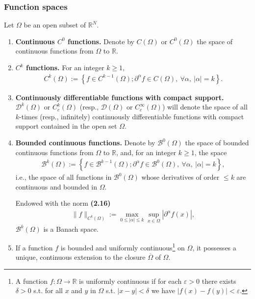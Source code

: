 \documentclass{book}
\numberwithin{equation}{section}
\begin{document}
\subsubsection{Function spaces}
Let $\Omega$ be an open subset of $\mathbb{R}^N$.
\begin{enumerate}
    \item \textbf{Continuous $C^0$ functions.} Denote by $C(\Omega)$ or $C^0(\Omega)$ the space of continuous functions from $\Omega$ to $\mathbb{R}$.
    \item \textbf{$C^k$ functions.} For an integer $k\ge 1$,
    \begin{align*}
        C^k\left(\Omega\right) := \left\{f\in C^{k-1}\left(\Omega\right);\partial^\alpha f\in C\left(\Omega\right),\ \forall\alpha,\ \left|\alpha\right| = k\right\}.
    \end{align*}
    \item \textbf{Continuously differentiable functions with compact support.} $\mathcal{D}^k(\Omega)$ or $C_c^k(\Omega)$ (resp., $\mathcal{D}(\Omega)$ or $C_c^\infty(\Omega)$) will denote the space of all $k$-times (resp., infinitely) continuously differentiable functions with compact support contained in the open set $\Omega$.
    \item \textbf{Bounded continuous functions.} Denote by $\mathcal{B}^0(\Omega)$ the space of bounded continuous functions from $\Omega$ to $\mathbb{R}$, and, for an integer $k\ge 1$, the space
    \begin{align*}
        \mathcal{B}^k\left(\Omega\right) := \left\{f\in\mathcal{B}^{k-1}\left(\Omega\right);\partial^\alpha f\in\mathcal{B}^0\left(\Omega\right),\ \forall\alpha,\ \left|\alpha\right| = k\right\},
    \end{align*}
    i.e., the space of all functions in $\mathcal{B}^0(\Omega)$ whose derivatives of order $\le k$ are continuous and bounded in $\Omega$.
    
    Endowed with the norm \textbf{(2.16)}
    \begin{align*}
        \|f\|_{C^k(\Omega)} := \max_{0\le\left|\alpha\right|\le k}\sup_{x\in\Omega} \left|\partial^\alpha f(x)\right|,
    \end{align*}
    $\mathcal{B}^k(\Omega)$ is a Banach space.
    \item If a function $f$ is bounded and uniformly continuous\footnote{A function $f:\Omega\to\mathbb{R}$ is uniformly continuous if for each $\varepsilon > 0$ there exists $\delta > 0$ s.t. for all $x$ and $y$ in $\Omega$ s.t. $|x - y| < \delta$ we have $|f(x) - f(y)| < \varepsilon$.} on $\Omega$, it possesses a unique, continuous extension to the closure $\overline{\Omega}$ of $\Omega$.
    

\end{enumerate}
\end{document}
